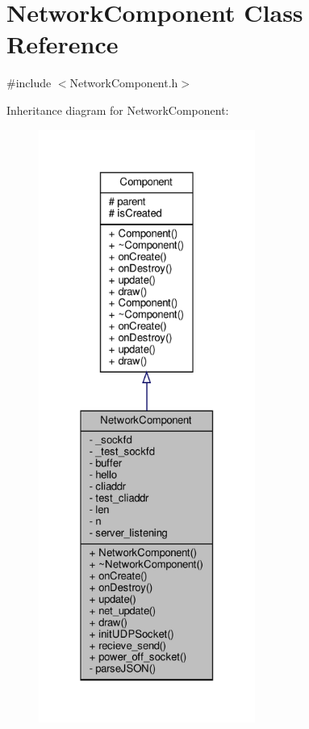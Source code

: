 \hypertarget{classNetworkComponent}{}\section{Network\+Component Class Reference}
\label{classNetworkComponent}


{\ttfamily \#include $<$Network\+Component.\+h$>$}



Inheritance diagram for Network\+Component\+:
\nopagebreak
\begin{figure}[H]
\begin{center}
\leavevmode
\includegraphics[height=550pt]{classNetworkComponent__inherit__graph}
\end{center}
\end{figure}


